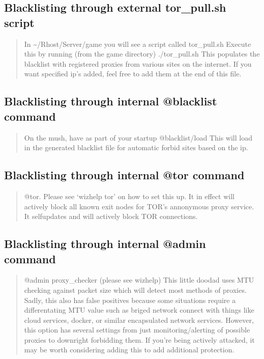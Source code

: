 \documentclass[letterpaper,10pt,english]{sphinxmanual}
\begin{document}
\subsection{Blacklisting through external tor\_pull.sh script}
\label{\detokenize{security:blacklisting-through-external-tor-pull-sh-script}}\begin{quote}

\sphinxAtStartPar
In \textasciitilde{}/Rhost/Server/game you will see a script called tor\_pull.sh
Execute this by running (from the game directory) ./tor\_pull.sh
This populates the blacklist with registered proxies from various sites
on the internet.  If you want specified ip’s added, feel free to add
them at the end of this file.
\end{quote}


\subsection{Blacklisting through internal @blacklist command}
\label{\detokenize{security:blacklisting-through-internal-blacklist-command}}\begin{quote}

\sphinxAtStartPar
On the mush, have as part of your startup @blacklist/load
This will load in the generated blacklist file for automatic forbid
sites based on the ip.
\end{quote}


\subsection{Blacklisting through internal @tor command}
\label{\detokenize{security:blacklisting-through-internal-tor-command}}\begin{quote}

\sphinxAtStartPar
@tor.  Please see ‘wizhelp tor’ on how to set this up.  It in effect
will actively block all known exit nodes for TOR’s annonymous proxy
service.  It self\sphinxhyphen{}updates and will actively block TOR connections.
\end{quote}


\subsection{Blacklisting through internal @admin command}
\label{\detokenize{security:blacklisting-through-internal-admin-command}}\begin{quote}

\sphinxAtStartPar
@admin proxy\_checker (please see wizhelp)
This little doodad uses MTU checking against packet size which will
detect most methods of proxies.  Sadly, this also has false positives
because some situations require a differentating MTU value such as
briged network connect with things like cloud services, docker, or
similar encapsulated network services.  However, this option has
several settings from just monitoring/alerting of possible proxies
to downright forbidding them.  If you’re being actively attacked,
it may be worth considering adding this to add additional protection.
\end{quote}
\end{document}
